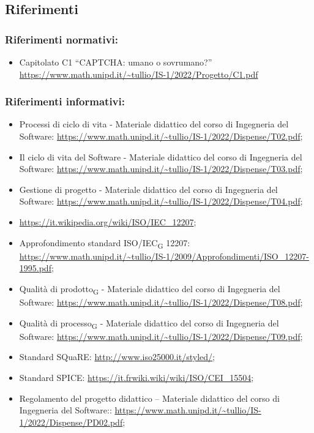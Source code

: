 \subsection{Riferimenti}

\subsubsection{Riferimenti normativi:}\:
\begin{itemize}
	\item Capitolato C1 “CAPTCHA: umano o sovrumano?”
	\url{https://www.math.unipd.it/~tullio/IS-1/2022/Progetto/C1.pdf}
\end{itemize}

\subsubsection{Riferimenti informativi:}\:
\begin{itemize}
	\item Processi di ciclo di vita - Materiale didattico del corso di Ingegneria del Software: \url{https://www.math.unipd.it/~tullio/IS-1/2022/Dispense/T02.pdf};
	\item Il ciclo di vita del Software - Materiale didattico del corso di Ingegneria del Software: \url{https://www.math.unipd.it/~tullio/IS-1/2022/Dispense/T03.pdf};
	\item Gestione di progetto - Materiale didattico del corso di Ingegneria del Software: \url{https://www.math.unipd.it/~tullio/IS-1/2022/Dispense/T04.pdf};
	\item \url{https://it.wikipedia.org/wiki/ISO/IEC_12207};
	\item Approfondimento standard ISO/IEC\textsubscript{G} 12207:  \url{https://www.math.unipd.it/~tullio/IS-1/2009/Approfondimenti/ISO_12207-1995.pdf};
	\item Qualità di prodotto\textsubscript{G} - Materiale didattico del corso di Ingegneria del Software: \url{https://www.math.unipd.it/~tullio/IS-1/2022/Dispense/T08.pdf};
	\item Qualità di processo\textsubscript{G} - Materiale didattico del corso di Ingegneria del Software: \url{https://www.math.unipd.it/~tullio/IS-1/2022/Dispense/T09.pdf};
	\item Standard SQuaRE: \url{http://www.iso25000.it/styled/};
	\item Standard SPICE: \url{https://it.frwiki.wiki/wiki/ISO/CEI_15504};
	\item Regolamento del progetto didattico – Materiale didattico del corso di Ingegneria del Software::
	\url{https://www.math.unipd.it/~tullio/IS-1/2022/Dispense/PD02.pdf};
\end{itemize}
